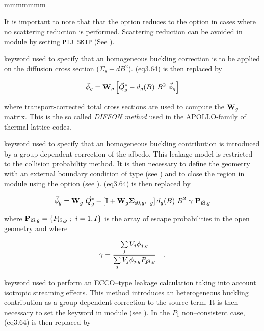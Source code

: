 \begin{ListeDeDescription}{mmmmmmm}
\vskip 0.02cm

\noindent It is important to note that that the  option reduces to the  option in
cases where no scattering reduction is performed. Scattering reduction can be avoided in module
 by setting {\tt PIJ SKIP} (See ).

\item[\moc{SIGS}] keyword used to specify that an homogeneous buckling
correction is to be applied on the diffusion cross section ($\Sigma_{s} -
dB^{2}$). \eq(eq3.64) is then replaced by

\begin{equation}
\vec\phi_g={\bf W}_g\left[ \vec Q^{*}_g-d_g(B) \ B^2 \ \vec\phi_g\right]
\label{eq:eq5.33}
\end{equation}

\noindent where transport-corrected total
cross sections are used to compute the ${\bf W}_g$ matrix. This is the so called
{\sl DIFFON method} used in the APOLLO-family of thermal lattice codes.

\item[\moc{ALBS}] keyword used to specify that an homogeneous buckling
contribution is introduced by a group dependent correction of the
albedo.\cite{ALSB2} This leakage model is restricted to the collision probability
method. It is then necessary to define the geometry with an
external boundary condition of type  (see ) and to close
the region in module  using the  option (see
). \eq(eq3.64) is then replaced by

\begin{equation}
\vec\phi_g={\bf W}_g \ \vec Q^{*}_g-\left[ {\bf I}+{\bf W}_g{\bf \Sigma}_{{\rm s0},g\gets g}\right] d_g(B) \ B^2 
\ \gamma \ {\bf P}_{{\rm iS},g}
\label{eq:eq5.34}
\end{equation}

\noindent where ${\bf P}_{{\rm iS},g}=\{P_{{\rm iS},g} \ ; \ i=1,I \}$ is the array of escape
probabilities in the open geometry and where

\begin{equation}
\gamma={\sum\limits_j V_j \phi_{j,g} \over \sum\limits_j V_j \phi_{j,g} P_{{\rm jS},g}} \ \ \ .
\label{eq:eq5.35}
\end{equation}

\item[\moc{ECCO}] keyword used to perform an ECCO--type leakage
calculation taking into account isotropic streaming effects. This method
introduces an heterogeneous buckling contribution as a group dependent correction
to the source term.\cite{ecco,rimpault} It is then necessary to set the keyword 
in module  (see ). In the $P_1$ non--consistent case,
\eq(eq3.64) is then replaced by


\end{ListeDeDescription}
